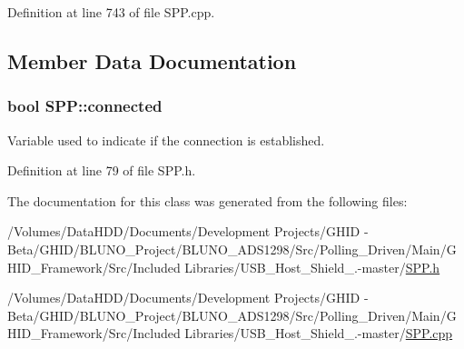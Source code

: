 \-Definition at line 743 of file \-S\-P\-P.\-cpp.



\subsection{\-Member \-Data \-Documentation}
\hypertarget{class_s_p_p_ade5d4f0ab50ddcad14f75fce4450a028}{
\subsubsection[{connected}]{\setlength{\rightskip}{0pt plus 5cm}bool {\bf \-S\-P\-P\-::connected}}}\label{class_s_p_p_ade5d4f0ab50ddcad14f75fce4450a028}
\-Variable used to indicate if the connection is established. 

\-Definition at line 79 of file \-S\-P\-P.\-h.



\-The documentation for this class was generated from the following files\-:\begin{DoxyCompactItemize}
\item 
/\-Volumes/\-Data\-H\-D\-D/\-Documents/\-Development Projects/\-G\-H\-I\-D -\/ Beta/\-G\-H\-I\-D/\-B\-L\-U\-N\-O\-\_\-\-Project/\-B\-L\-U\-N\-O\-\_\-\-A\-D\-S1298/\-Src/\-Polling\-\_\-\-Driven/\-Main/\-G\-H\-I\-D\-\_\-\-Framework/\-Src/\-Included Libraries/\-U\-S\-B\-\_\-\-Host\-\_\-\-Shield\-\_.-\/master/\hyperlink{_s_p_p_8h}{\-S\-P\-P.\-h}\item 
/\-Volumes/\-Data\-H\-D\-D/\-Documents/\-Development Projects/\-G\-H\-I\-D -\/ Beta/\-G\-H\-I\-D/\-B\-L\-U\-N\-O\-\_\-\-Project/\-B\-L\-U\-N\-O\-\_\-\-A\-D\-S1298/\-Src/\-Polling\-\_\-\-Driven/\-Main/\-G\-H\-I\-D\-\_\-\-Framework/\-Src/\-Included Libraries/\-U\-S\-B\-\_\-\-Host\-\_\-\-Shield\-\_.-\/master/\hyperlink{_s_p_p_8cpp}{\-S\-P\-P.\-cpp}\end{DoxyCompactItemize}
